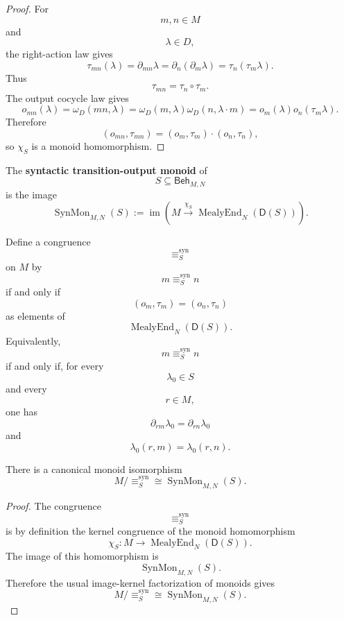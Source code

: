 \begin{proof}
For
\[
m,n\in M
\]
and
\[
\lambda\in D,
\]
the right-action law gives
\[
\tau_{mn}(\lambda)
=
\partial_{mn}\lambda
=
\partial_n(\partial_m\lambda)
=
\tau_n(\tau_m\lambda).
\]
Thus
\[
\tau_{mn}
=
\tau_n\circ\tau_m.
\]
The output cocycle law gives
\[
o_{mn}(\lambda)
=
\omega_D(mn,\lambda)
=
\omega_D(m,\lambda)\omega_D(n,\lambda\cdot m)
=
o_m(\lambda)o_n(\tau_m\lambda).
\]
Therefore
\[
(o_{mn},\tau_{mn})
=
(o_m,\tau_m)\cdot(o_n,\tau_n),
\]
so \(\chi_S\) is a monoid homomorphism.
\end{proof}

\begin{definition}
\label{def:syntactic-transition-output-monoid}
The \textbf{syntactic transition-output monoid} of
\[
S\subseteq\mathsf{Beh}_{M,N}
\]
is the image
\[
\operatorname{SynMon}_{M,N}(S)
:=
\operatorname{im}
\left(
M
\xrightarrow{\chi_S}
\operatorname{MealyEnd}_N(\mathsf D(S))
\right).
\]
\end{definition}

\begin{definition}
\label{def:syntactic-congruence-on-input-monoid}
Define a congruence
\[
{\equiv_S^{\operatorname{syn}}}
\]
on \(M\) by
\[
m\equiv_S^{\operatorname{syn}} n
\]
if and only if
\[
(o_m,\tau_m)=(o_n,\tau_n)
\]
as elements of
\[
\operatorname{MealyEnd}_N(\mathsf D(S)).
\]
Equivalently,
\[
m\equiv_S^{\operatorname{syn}} n
\]
if and only if, for every
\[
\lambda_0\in S
\]
and every
\[
r\in M,
\]
one has
\[
\partial_{rm}\lambda_0
=
\partial_{rn}\lambda_0
\]
and
\[
\lambda_0(r,m)=\lambda_0(r,n).
\]
\end{definition}

\begin{theorem}
\label{thm:syntactic-monoid-quotient}
There is a canonical monoid isomorphism
\[
M/{\equiv_S^{\operatorname{syn}}}
\cong
\operatorname{SynMon}_{M,N}(S).
\]
\end{theorem}

\begin{proof}
The congruence
\[
{\equiv_S^{\operatorname{syn}}}
\]
is by definition the kernel congruence of the monoid homomorphism
\[
\chi_S:
M\to
\operatorname{MealyEnd}_N(\mathsf D(S)).
\]
The image of this homomorphism is
\[
\operatorname{SynMon}_{M,N}(S).
\]
Therefore the usual image-kernel factorization of monoids gives
\[
M/{\equiv_S^{\operatorname{syn}}}
\cong
\operatorname{SynMon}_{M,N}(S).
\]
\end{proof}

